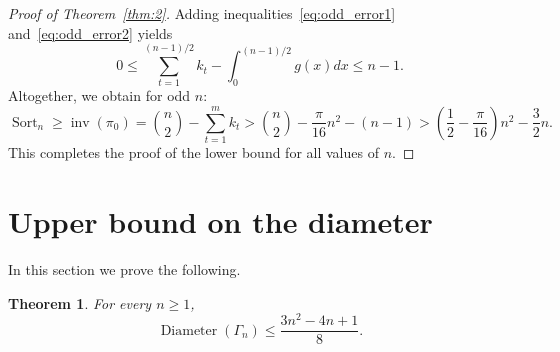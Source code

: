 \documentclass[11pt]{amsart}
\newtheorem{theorem}{Theorem}[section]
\numberwithin{equation}{section}
\newcommand{\todo}[1]{\vspace{5 mm}\par \noindent
\marginpar{\textsc{ToDo}} \framebox{\begin{minipage}[c]{0.95
\textwidth}
 #1 \end{minipage}}\vspace{5 mm}\par}
\newcommand{\ZZ}{{\mathbb {Z}}}
\newcommand{\inv}{{\operatorname{inv}}}
\newcommand{\minv}{{\operatorname{minv}}}
\newcommand{\D}{{\operatorname{Diameter}}}
\newcommand{\Sort}{{\operatorname{Sort}}}
\begin{document}
\begin{proof}[Proof of Theorem~\ref{thm:2}]
Adding inequalities~\eqref{eq:odd_error1} and~\eqref{eq:odd_error2} yields
\[
    0 
    \le \sum_{t=1}^{(n-1)/2} k_t  - \int_0^{(n-1)/2} g(x)dx
    \le n-1 .
\]
Altogether, we obtain 
for odd $n$:
\[
    \Sort_n
    \ge \inv(\pi_0)
    = \binom{n}{2}-\sum_{t=1}^m k_t
    > \binom{n}{2}-\frac{\pi}{16} n^2 - (n-1)
    > \left( \frac{1}{2}-\frac{\pi}{16} \right) n^2 -\frac{3}{2} n.
\]
This completes the proof of the lower bound for all values of $n$.
\end{proof}


\section{Upper bound on the diameter}%

In this section we prove the following. 

\begin{theorem}\label{thm:1}
    For every $n\ge 1$,
    \[
        \D(\Gamma_n) 
        \le \frac{3n^2 - 4n + 1}{8}.
    \]
\end{theorem}
\end{document}
